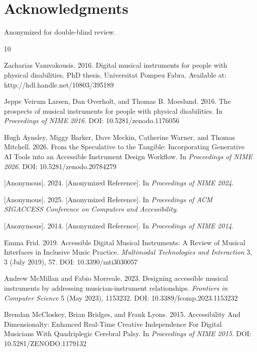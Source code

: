 \documentclass[manuscript,screen,review,anonymous]{acmart}
\begin{document}
\section{Acknowledgments}

Anonymized for double-blind review.


\begin{thebibliography}{10}


Zacharias Vamvakousis. 2016.
Digital musical instruments for people with physical disabilities.
PhD thesis, Universitat Pompeu Fabra.
Available at: http://hdl.handle.net/10803/395189

Jeppe Veirum Larsen, Dan Overholt, and Thomas B. Moeslund. 2016.
The prospects of musical instruments for people with physical disabilities.
In \textit{Proceedings of NIME 2016}.
DOI: 10.5281/zenodo.1176056  

Hugh Aynsley, Miggy Barker, Dave Meckin, Catherine Warner, and Thomas Mitchell. 2026.
From the Speculative to the Tangible: Incorporating Generative AI Tools into an Accessible Instrument Design Workflow.
In \textit{Proceedings of NIME 2026}.
DOI: 10.5281/zenodo.20784279  

[Anonymous]. 2024.
[Anonymized Reference].
In \textit{Proceedings of NIME 2024}.

[Anonymous]. 2025.
[Anonymized Reference].
In \textit{Proceedings of ACM SIGACCESS Conference on Computers and Accessibility}.

[Anonymous]. 2014.
[Anonymized Reference].
In \textit{Proceedings of NIME 2014}.

Emma Frid. 2019.
Accessible Digital Musical Instruments: A Review of Musical Interfaces in Inclusive Music Practice.
\textit{Multimodal Technologies and Interaction} 3, 3 (July 2019), 57.
DOI: 10.3390/mti3030057

Andrew McMillan and Fabio Morreale. 2023.
Designing accessible musical instruments by addressing musician-instrument relationships.
\textit{Frontiers in Computer Science} 5 (May 2023), 1153232.
DOI: 10.3389/fcomp.2023.1153232

Brendan McCloskey, Brian Bridges, and Frank Lyons. 2015.
Accessibility And Dimensionalty: Enhanced Real-Time Creative Independence For Digital Musicians With Quadriplegic Cerebral Palsy.
In \textit{Proceedings of NIME 2015}.
DOI: 10.5281/ZENODO.1179132


\end{thebibliography}
\end{document}
